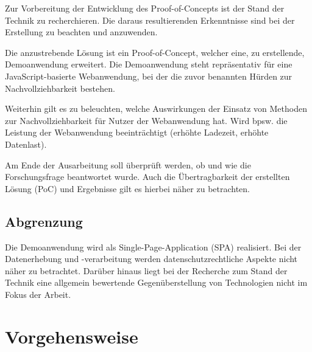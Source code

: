 
Zur Vorbereitung der Entwicklung des Proof-of-Concepts ist der Stand der Technik zu recherchieren. Die daraus resultierenden Erkenntnisse sind bei der Erstellung zu beachten und anzuwenden.

Die anzustrebende Lösung ist ein Proof-of-Concept, welcher eine, zu erstellende, Demoanwendung erweitert. Die Demoanwendung steht repräsentativ für eine JavaScript-basierte Webanwendung, bei der die zuvor benannten Hürden zur Nachvollziehbarkeit bestehen.

Weiterhin gilt es zu beleuchten, welche Auswirkungen der Einsatz von Methoden zur Nachvollziehbarkeit für Nutzer der Webanwendung hat. Wird bpsw. die Leistung der Webanwendung beeinträchtigt (erhöhte Ladezeit, erhöhte Datenlast).

Am Ende der Ausarbeitung soll überprüft werden, ob und wie die Forschungsfrage beantwortet wurde. Auch die Übertragbarkeit der erstellten Lösung (PoC) und Ergebnisse gilt es hierbei näher zu betrachten.

\subsection{Abgrenzung}


Die Demoanwendung wird als Single-Page-Application (SPA) \cite{SinglePageApplication} realisiert. Bei der Datenerhebung und -verarbeitung werden datenschutzrechtliche Aspekte nicht näher zu betrachtet. Darüber hinaus liegt bei der Recherche zum Stand der Technik eine allgemein bewertende Gegenüberstellung von Technologien nicht im Fokus der Arbeit.

\pagebreak

\section{Vorgehensweise}

